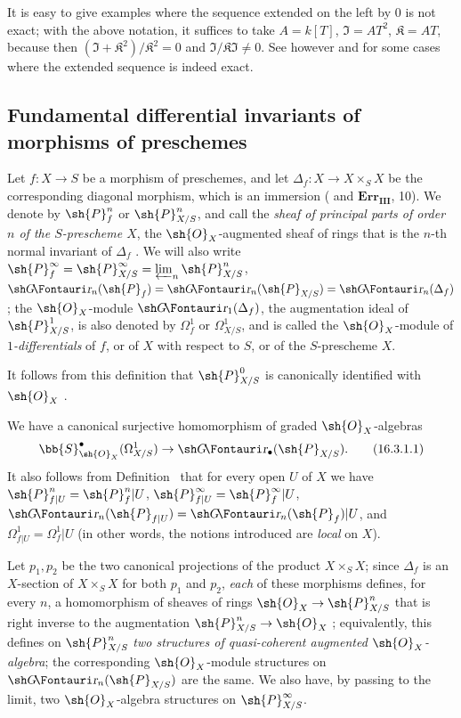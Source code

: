 It is easy to give examples where the sequence  extended on the left by $0$ is not exact;
with the above notation, it suffices to take $A = k[T]$, $\mathfrak{I} = AT^2$, $\mathfrak{K} = AT$, because then $(\mathfrak{I} + \mathfrak{K}^2)/\mathfrak{K}^2 = 0$ and $\mathfrak{I}/\mathfrak{K}\mathfrak{I} \neq 0$.
See however  and  for some cases where the extended sequence is indeed exact.

\subsection{Fundamental differential invariants of morphisms of preschemes}
\label{IV.16.3}

\begin{definition}[16.3.1]
\label{IV.16.3.1}
Let $f:X\to S$ be a morphism of preschemes, and let $\Delta_f:X\to X\times_S X$ be the corresponding diagonal morphism, which is an immersion ( and $\mathbf{Err_{III}}$, 10).
We denote by $\sh{P}_f^n$ or $\sh{P}_{X/S}^n$, and call the \emph{sheaf of principal parts of order $n$ of the $S$-prescheme $X$}, the $\sh{O}_X$-augmented sheaf of rings that is the $n$-th normal invariant of $\Delta_f$ .
We will also write $\sh{P}_f^\infty = \sh{P}_{X/S}^\infty = \varprojlim_n \sh{P}_{X/S}^n$, $\shGr_n(\sh{P}_f) = \shGr_n(\sh{P}_{X/S}) = \shGr_n(\Delta_f)$ ;
the $\sh{O}_X$-module $\shGr_1(\Delta_f)$, the augmentation ideal of $\sh{P}_{X/S}^1$, is also denoted by $\Omega_f^1$ or $\Omega_{X/S}^1$, and is called the $\sh{O}_X$-module of \emph{$1$-differentials} of $f$, or of $X$ with respect to $S$, or of the $S$-prescheme $X$.
\end{definition}

It follows from this definition that $\sh{P}_{X/S}^0$ is canonically identified with $\sh{O}_X$ .

We have  a canonical surjective homomorphism of graded $\sh{O}_X$-algebras
\[
  \label{IV.16.3.1.1}
  \bb{S}_{\sh{O}_X}^\bullet(\Omega_{X/S}^1) \to \shGr_\bullet(\sh{P}_{X/S}).
  \tag{16.3.1.1}
\]
It also follows from Definition~ that for every open $U$ of $X$ we have $\sh{P}_{f|U}^n=\sh{P}_f^n|U$, $\sh{P}_{f|U}^\infty=\sh{P}_f^\infty|U$, $\shGr_n(\sh{P}_{f|U})=\shGr_n(\sh{P}_f)|U$, and $\Omega_{f|U}^1=\Omega_f^1|U$ (in other words, the notions introduced are \emph{local} on $X$).

\begin{env}[16.3.2]
\label{IV.16.3.2}
Let $p_1,p_2$ be the two canonical projections of the product $X\times_S X$;
since $\Delta_f$ is an $X$-section of $X\times_S X$ for both $p_1$ and $p_2$, \emph{each} of these morphisms defines, for every $n$, a homomorphism of sheaves of rings $\sh{O}_X\to\sh{P}_{X/S}^n$ that is right inverse to the augmentation $\sh{P}_{X/S}^n\to\sh{O}_X$ ;
equivalently, this defines on $\sh{P}_{X/S}^n$ \emph{two structures of quasi-coherent augmented $\sh{O}_X$-algebra};
the corresponding $\sh{O}_X$-module structures on $\shGr_n(\sh{P}_{X/S})$ are the same.
We also have, by passing to the limit, two $\sh{O}_X$-algebra structures on $\sh{P}_{X/S}^\infty$.
\end{env}

